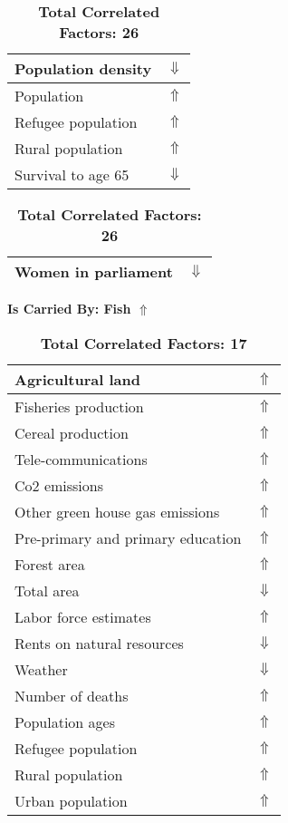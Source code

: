 \documentclass[12pt,notitlepage,oneside]{report}
\begin{document}
\begin{table}[!htb]
\begin{tabular}{|l|l|}
Population density & $\Downarrow$\\ \hline
Population & $\Uparrow$\\ \hline
Refugee population & $\Uparrow$\\ \hline
Rural population & $\Uparrow$\\ \hline
Survival to age 65 & $\Downarrow$\\ \hline
\end{tabular}
\begin{tabular}{|l|l|}
\hline
Women in parliament & $\Downarrow$\\ \hline
\end{tabular}
\caption*{\textbf{Total Correlated Factors: 26}}
\end{table}
\clearpage
\begin{table}[!htb]
\caption{\textbf{Is Carried By: Fish $\Uparrow$}}
\centering
\label{Correlated Socio-economic Factors0}
\begin{tabular}{|l|l|}
\hline
Agricultural land & $\Uparrow$\\ \hline
Fisheries production & $\Uparrow$\\ \hline
Cereal production & $\Uparrow$\\ \hline
Tele-communications & $\Uparrow$\\ \hline
Co2 emissions & $\Uparrow$\\ \hline
Other green house gas emissions & $\Uparrow$\\ \hline
Pre-primary and primary education & $\Uparrow$\\ \hline
Forest area & $\Uparrow$\\ \hline
Total area & $\Downarrow$\\ \hline
Labor force estimates & $\Uparrow$\\ \hline
Rents on natural resources & $\Downarrow$\\ \hline
Weather & $\Downarrow$\\ \hline
Number of deaths & $\Uparrow$\\ \hline
Population ages & $\Uparrow$\\ \hline
Refugee population & $\Uparrow$\\ \hline
Rural population & $\Uparrow$\\ \hline
Urban population & $\Uparrow$\\ \hline
\end{tabular}
\caption*{\textbf{Total Correlated Factors: 17}}
\end{table}
\end{document}
